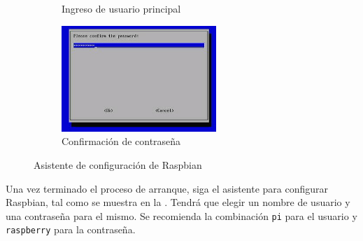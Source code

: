 \documentclass[letterpaper,10.5pt]{article}
\begin{document}
\begin{figure}[H]
\begin{subfigure}[b]{0.50\linewidth}
		\caption{Ingreso de usuario principal}
		\label{fig:setup-wizard-step-3} %
	\end{subfigure}%
	\begin{subfigure}[b]{0.50\linewidth}
		\centering
		\includegraphics[width=0.9\linewidth,height=40mm,keepaspectratio]{img/p01-03-wizard-4.jpg} %
		\caption{Confirmación de contraseña}
		\label{fig:setup-wizard-step-4} %
	\end{subfigure}%
	\caption{Asistente de configuración de Raspbian}%
	\label{fig:setup-wizard} %
\end{figure}

Una vez terminado el proceso de arranque, siga el asistente para configurar Raspbian, tal como se muestra en la .
Tendrá que elegir un nombre de usuario y una contraseña para el mismo.
Se recomienda la combinación \texttt{pi} para el usuario y \texttt{raspberry} para la contraseña.
\end{document}

